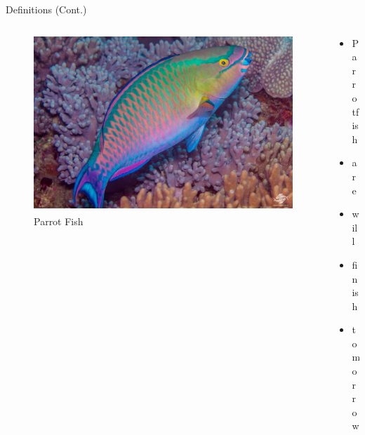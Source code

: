 \documentclass{beamer}
\begin{document}
\begin{frame}{Definitions (Cont.)}
    \begin{columns}
        \begin{column}{0.5\textwidth}
            \begin{figure}
                \centering
                \includegraphics[width=1\textwidth]{Latex/Figures/parrot_fish.jpg}
                \caption{Parrot Fish\textsuperscript{\cite{img_parrot_fish}}}
                \label{fig:my_label}
            \end{figure}
        \end{column}
        \begin{column}{0.5\textwidth}
            \begin{itemize}
                \item Parrotfish
                \item are
                \item will
                \item finish
                \item tomorrow
            \end{itemize}
        \end{column}
    \end{columns}
\end{frame}
\end{document}

